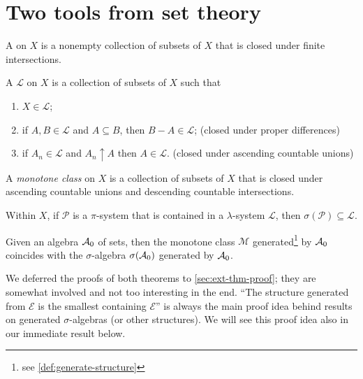 \section{Two tools from set theory} \label{sec:tools-set}
\begin{defn}
A  on $X$ is a nonempty collection of subsets of $X$ that is closed under finite intersections.

A  $\mathcal{L}$ on $X$ is a collection of subsets of $X$ such that 
\begin{enumerate}
    \item $X\in\mathcal{L}$; 
    \item \label{enu:prop-diff-lam-sys} if $A,B\in\mathcal{L}$ and $A\subseteq B$, then $B-A\in\mathcal{L}$; (closed under proper differences)
    \item if $A_{n}\in\mathcal{L}$ and $A_{n}\uparrow A$ then $A\in\mathcal{L}$. (closed under ascending countable unions)
\end{enumerate}
\end{defn}
\begin{defn}
    A \emph{monotone class} on $X$ is a collection of subsets of $X$ that is closed under ascending countable unions and descending countable intersections.
    
\end{defn}
\begin{namedthm} \label{thm:pi-lambda}
     Within $X$, if $\mathcal{P}$ is a $\pi$-system that is contained in a $\lambda$-system $\mathcal{L}$, then $\sigma(\mathcal{P})\subseteq\mathcal{L}$.
\end{namedthm}
\begin{namedthm} \label{thm:monotone-class}
     Given an algebra $\mathcal{A}_0$ of sets, then the monotone class $\mathcal{M}$ generated\footnote{see \cref{def:generate-structure}} by $\mathcal{A}_0$ coincides with the $\sigma$-algebra $\sigma(\mathcal{A}_0)$ generated by $\mathcal{A}_0$.
\end{namedthm}

We deferred the proofs of both theorems to \cref{sec:ext-thm-proof}; they are somewhat involved and not too interesting in the end. ``The structure generated from $\mathcal E$ is the smallest containing $\mathcal E$'' is always the main proof idea behind results on generated $\sigma$-algebras (or other structures). We will see this proof idea also in our immediate result below.

